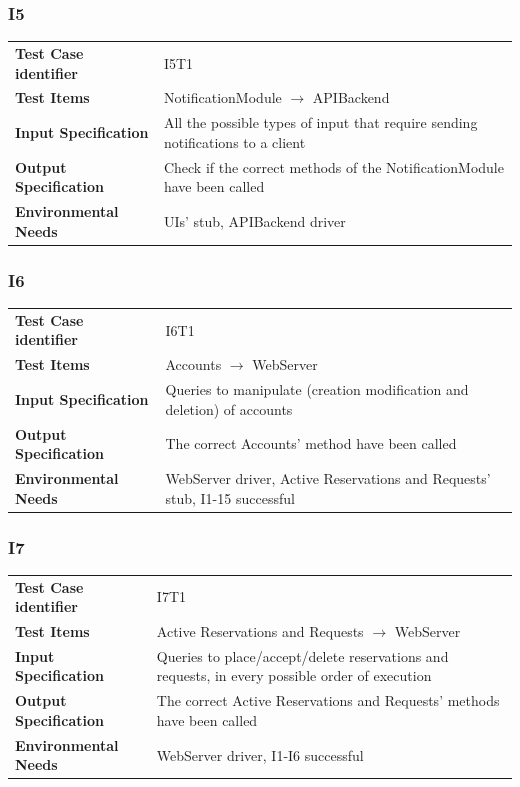 \documentclass{article}
\begin{document}
\subsubsection{I5}
\begin{adjustbox}{width=1.2\textwidth}	
	\begin{tabular}{*{2}{p{}}}
		\toprule
		\textbf{Test Case identifier} & I5T1\\
		\textbf{Test Items} & NotificationModule $\rightarrow$ APIBackend\\
		\textbf{Input Specification} & All the possible types of input that require sending notifications to a client \\ 
		\textbf{Output Specification} & Check if the correct methods of the NotificationModule have been called\\
		\textbf{Environmental Needs} & UIs' stub, APIBackend driver\\
		\bottomrule
	\end{tabular}
\end{adjustbox}
\subsubsection{I6}
\begin{adjustbox}{width=1.2\textwidth}	
	\begin{tabular}{*{2}{p{}}}
		\toprule
		\textbf{Test Case identifier} & I6T1\\
		\textbf{Test Items} & Accounts $\rightarrow$ WebServer\\
		\textbf{Input Specification} & Queries to manipulate (creation modification and deletion) of accounts\\
		\textbf{Output Specification} & The correct Accounts' method have been called\\
		\textbf{Environmental Needs} & WebServer driver, Active Reservations and Requests' stub, I1-15 successful\\
		\bottomrule
	\end{tabular}
\end{adjustbox}
\subsubsection{I7}
\begin{adjustbox}{width=1.2\textwidth}	
	\begin{tabular}{*{2}{p{}}}
		\toprule
		\textbf{Test Case identifier} & I7T1\\
		\textbf{Test Items} & Active Reservations and Requests $\rightarrow$ WebServer\\
		\textbf{Input Specification} & Queries to place/accept/delete reservations and requests, in every possible order of execution\\ 
		\textbf{Output Specification} & The correct Active Reservations and Requests' methods have been called\\
		\textbf{Environmental Needs} & WebServer driver, I1-I6 successful\\
		\bottomrule
	\end{tabular}
\end{adjustbox}
\end{document}
